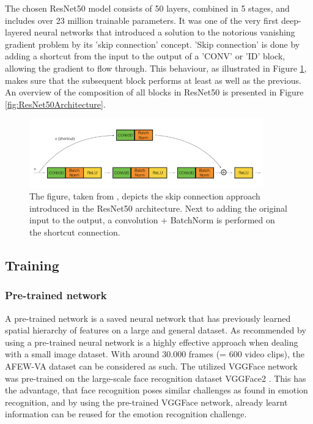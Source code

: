 The chosen ResNet50 \citep{He:2015:DeepResidualLearningForImageRecognition} model consists of 50 layers, combined in 5 stages, and includes over 23 million trainable parameters. It was one of the very first deep-layered neural networks that introduced a solution to the notorious vanishing gradient problem by its 'skip connection' concept.
\newline\newline
'Skip connection' is done by adding a shortcut from the input to the output of a 'CONV' or 'ID' block, allowing the gradient to flow through. This behaviour, as illustrated in Figure \ref{fig:ResNet50ConvBlock}, makes sure that the subsequent block performs at least as well as the previous. An overview of the composition of all blocks in ResNet50 is presented in Figure \ref{fig:ResNet50Architecture}. 

\begin{figure}[H]
  \begin{center}
  \includegraphics[angle=0, width=0.9\textwidth]{Figures/ResNet50_ConvBlock.png}
  \caption[ResNet50 skip connection]{The figure, taken from \citep{Dwivedi:2019:ResNetInKeras}, depicts the skip connection approach introduced in the ResNet50 \citep{He:2015:DeepResidualLearningForImageRecognition} architecture. Next to adding the original input to the output, a convolution + BatchNorm is performed on the shortcut connection.}
  \label{fig:ResNet50ConvBlock}
  \end{center}
\end{figure}


\subsection{Training} \label{sec:Training&Regularization}
\subsubsection{Pre-trained network}
A pre-trained network is a saved neural network that has previously learned spatial hierarchy of features on a large and general dataset. As recommended by \citet{Chollet:2017:DeepLearningPython} using a pre-trained neural network is a highly effective approach when dealing with a small image dataset. With around 30.000 frames (= 600 video clips), the AFEW-VA dataset \citep{Kossaifi:2017:AFEW-VADatabase} can be considered as such. The utilized VGGFace network was pre-trained on the large-scale face recognition dataset VGGFace2 \citep{Cao:2018:VGGFace2}. This has the advantage, that face recognition poses similar challenges as found in emotion recognition, and by using the pre-trained VGGFace network, already learnt information can be reused for the emotion recognition challenge.

